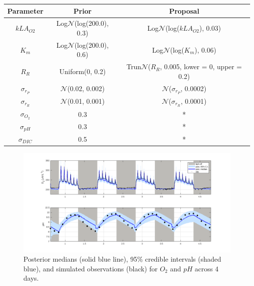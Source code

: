\documentclass{ruthesis}
\begin{document}
\FloatBarrier
\begin{tabular}{c | c  |  c}
	\hline
	\bfseries{Parameter} & \bfseries{Prior} &  \bfseries{Proposal} \\ \hline
	$kLA_{O2}$  & Log$\mathcal{N}$(log(200.0), 0.3)  & Log$\mathcal{N}$(log($kLA_{O2}$), 0.03) \\
	$K_m$ 		&  Log$\mathcal{N}$(log(200.0), 0.6) & Log$\mathcal{N}$(log($K_m$), 0.06) \\
	$R_R$  		& Uniform(0, 0.2) &  Trun$\mathcal{N}$($R_R$, 0.005, lower = 0, upper = 0.2) \\
	$\sigma_{r_P}$ & $\mathcal{N}$(0.02, 0.002)   & $\mathcal{N}$($\sigma_{r_P}$, 0.0002)   \\
	$\sigma_{r_R}$ & $\mathcal{N}$(0.01, 0.001)   & $\mathcal{N}$($\sigma_{r_R}$, 0.0001)   \\
	$\sigma_{O_2}$ 	& 0.3 	& * \\
	$\sigma_{pH}$ 	& 0.3 	& * \\
	$\sigma_{DIC}$ 	& 0.5 	& * \\	
\end{tabular}

\FloatBarrier



\begin{figure}
	\centerline{\includegraphics[width=1.2\textwidth]{images_microalgae/plots_chris/O2_pH}}
	\caption[.]{Posterior medians (solid blue line), 95\% credible intervals (shaded blue), and simulated observations (black) for $O_2$ and $pH$ across 4 days.}
	\label{fig:micro_exp_O2_pH}
\end{figure}
\end{document}
